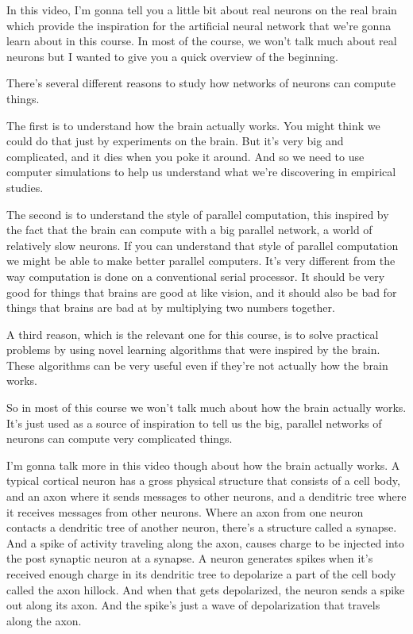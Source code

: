 \begin{multicols}{2}
\begin{footnotesize}
In this video, I'm gonna tell you a little bit about real neurons on the real brain which provide the inspiration for the artificial neural network that we're gonna learn about in this course. In most of the course, we won't talk much about real neurons but I wanted to give you a quick overview of the beginning.

There's several different reasons to study how networks of neurons can compute things.
\begin{nitemize}
\item The first is to understand how the brain actually works. You might think we could do that just by experiments on the brain. But it's very big and complicated, and it dies when you poke it around. And so we need to use computer simulations to help us understand what we're discovering in empirical studies.

\item The second is to understand the style of parallel computation, this inspired by the fact that the brain can compute with a big parallel network, a world of relatively slow neurons. If you can understand that style of parallel computation we might be able to make better parallel computers. It's very different from the way computation is done on a conventional serial processor. It should be very good for things that brains are good at like vision, and it should also be bad for things that brains are bad at by multiplying two numbers together. 

\item A third reason, which is the relevant one for this course, is to solve practical problems by using novel learning algorithms that were inspired by the brain. These algorithms can be very useful even if they're not actually how the brain works.
\end{nitemize}
So in most of this course we won't talk much about how the brain actually works. It's just used as a source of inspiration to tell us the big, parallel networks of neurons can compute very complicated things. 

I'm gonna talk more in this video though about how the brain actually works. A typical cortical neuron has a gross physical structure that consists of a cell body, and an axon where it sends messages to other neurons, and a denditric tree where it receives messages from other neurons. Where an axon from one neuron contacts a dendritic tree of another neuron, there's a structure called a synapse. And a spike of activity traveling along the axon, causes charge to be injected into the post synaptic neuron at a synapse. A neuron generates spikes when it's received enough charge in its dendritic tree to depolarize a part of the cell body called the axon hillock. And when that gets depolarized, the neuron sends a spike out along its axon. And the spike's just a wave of depolarization that travels along the axon. 


\end{footnotesize}
\end{multicols}
